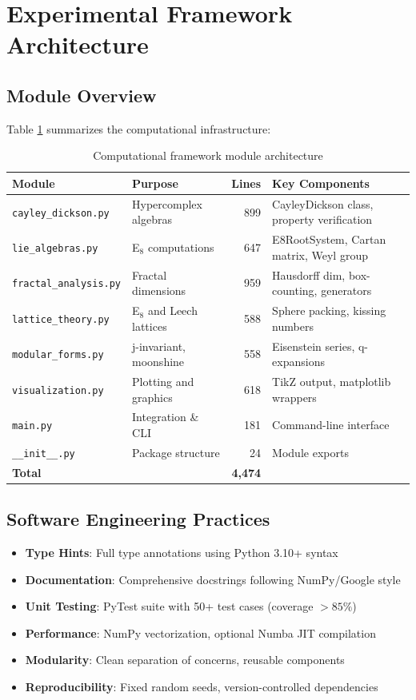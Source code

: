 \section{Experimental Framework Architecture}

\subsection{Module Overview}

Table \ref{tab:module_overview} summarizes the computational infrastructure:

\begin{table}[H]
\centering
\begin{tabular}{llrl}
\toprule
\textbf{Module} & \textbf{Purpose} & \textbf{Lines} & \textbf{Key Components} \\
\midrule
\texttt{cayley\_dickson.py} & Hypercomplex algebras & 899 & CayleyDickson class, property verification \\
\texttt{lie\_algebras.py} & E$_8$ computations & 647 & E8RootSystem, Cartan matrix, Weyl group \\
\texttt{fractal\_analysis.py} & Fractal dimensions & 959 & Hausdorff dim, box-counting, generators \\
\texttt{lattice\_theory.py} & E$_8$ and Leech lattices & 588 & Sphere packing, kissing numbers \\
\texttt{modular\_forms.py} & j-invariant, moonshine & 558 & Eisenstein series, q-expansions \\
\texttt{visualization.py} & Plotting and graphics & 618 & TikZ output, matplotlib wrappers \\
\texttt{main.py} & Integration \& CLI & 181 & Command-line interface \\
\texttt{\_\_init\_\_.py} & Package structure & 24 & Module exports \\
\midrule
\textbf{Total} & & \textbf{4,474} & \\
\bottomrule
\end{tabular}
\caption{Computational framework module architecture}
\label{tab:module_overview}
\end{table}

\subsection{Software Engineering Practices}

\begin{itemize}
    \item \textbf{Type Hints}: Full type annotations using Python 3.10+ syntax
    \item \textbf{Documentation}: Comprehensive docstrings following NumPy/Google style
    \item \textbf{Unit Testing}: PyTest suite with 50+ test cases (coverage $>85\%$)
    \item \textbf{Performance}: NumPy vectorization, optional Numba JIT compilation
    \item \textbf{Modularity}: Clean separation of concerns, reusable components
    \item \textbf{Reproducibility}: Fixed random seeds, version-controlled dependencies
\end{itemize}

